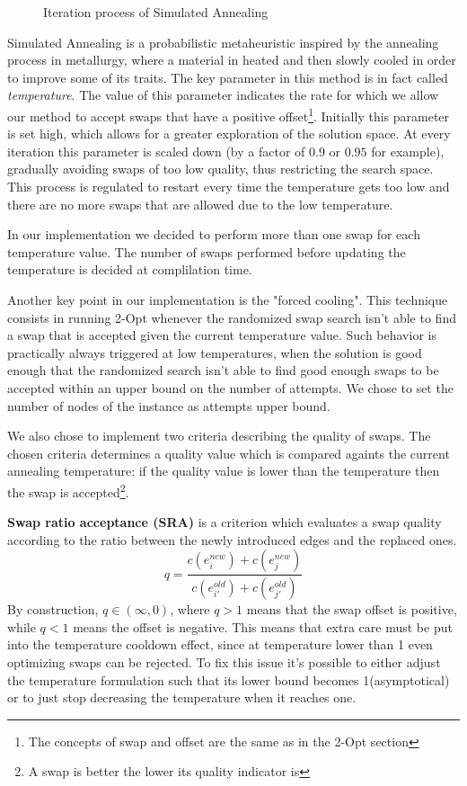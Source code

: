 \begin{figure}[htbp]
    \caption{Iteration process of Simulated Annealing}
    \label{fig:sa}
\end{figure}

Simulated Annealing is a probabilistic metaheuristic inspired by the annealing process in metallurgy, where a material in heated and then slowly cooled in order to improve some of its traits.
The key parameter in this method is in fact called \textit{temperature}.
The value of this parameter indicates the rate for which we allow our method to accept swaps that have a positive offset\footnote{The concepts of swap and offset are the same as in the 2-Opt section}.
Initially this parameter is set high, which allows for a greater exploration of the solution space.
At every iteration this parameter is scaled down (by a factor of $0.9$ or $0.95$ for example), gradually avoiding swaps of too low quality, thus restricting the search space. 
This process is regulated to restart every time the temperature gets too low and there are no more swaps that are allowed due to the low temperature.

In our implementation we decided to perform more than one swap for each temperature value.
The number of swaps performed before updating the temperature is decided at complilation time.

Another key point in our implementation is the "forced cooling".
This technique consists in running 2-Opt whenever the randomized swap search isn't able to find a swap that is accepted given the current temperature value.
Such behavior is practically always triggered at low temperatures, when the solution is good enough that the randomized search isn't able to find good enough swaps to be accepted within an upper bound on the number of attempts.
We chose to set the number of nodes of the instance as attempts upper bound.

We also chose to implement two criteria describing the quality of swaps.
The chosen criteria determines a quality value which is compared againts the current annealing temperature: if the quality value is lower than the temperature then the swap is accepted\footnote{A swap is better the lower its quality indicator is}.

\textbf{Swap ratio acceptance (SRA)} is a criterion which evaluates a swap quality according to the ratio between the newly introduced edges and the replaced ones.
\[
    q = \frac{c(e^{new}_i) + c(e^{new}_j)}{c(e^{old}_{i'}) + c(e^{old}_{j'})}
\]
By construction, $q \in (\infty,0)$, where $q > 1$ means that the swap offset is positive, while $q < 1$ means the offset is negative.
This means that extra care must be put into the temperature cooldown effect, since at temperature lower than 1 even optimizing swaps can be rejected.
To fix this issue it's possible to either adjust the temperature formulation such that its lower bound becomes 1(asymptotical) or to just stop decreasing the temperature when it reaches one.
 
